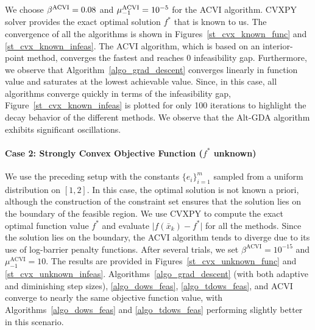 \documentclass{article}
\theoremstyle{plain}
\theoremstyle{definition}
\theoremstyle{remark}
\begin{document}
We choose $\beta^{\rm ACVI} = 0.08$ and $\mu_{-1}^{\rm ACVI} = 10^{-5}$ for the ACVI algorithm. CVXPY solver provides the exact optimal solution $f^*$ that is known to us. The convergence of all the algorithms is shown in Figures~\ref{st_cvx_known_func} and \ref{st_cvx_known_infeas}. The ACVI algorithm, which is based on an interior-point method, converges the fastest and reaches $0$ infeasibility gap. Furthermore, we observe that Algorithm~\ref{algo_grad_descent} converges linearly in function value and saturates at the lowest achievable value. Since, in this case, all algorithms converge quickly in terms of the infeasibility gap, Figure~\ref{st_cvx_known_infeas} is plotted for only 100 iterations to highlight the decay behavior of the different methods. We observe that the Alt-GDA algorithm exhibits significant oscillations.


\paragraph{Case 2: Strongly Convex Objective Function ($f^*$ unknown)}

We use the preceding setup with the constants $\{e_i\}_{i=1}^m$ sampled from a uniform distribution on $[1,2]$. In this case, the optimal solution is not known a priori, although the construction of the constraint set ensures that the solution lies on the boundary of the feasible region. We use CVXPY to compute the exact optimal function value $f^*$ and evaluate $\lvert f(\bar{x}_k) - f^* \rvert$ for all the methods. Since the solution lies on the boundary, the ACVI algorithm tends to diverge due to its use of log-barrier penalty functions. After several trials, we set $\beta^{\mathrm{ACVI}} = 10^{-15}$ and $\mu_{-1}^{\mathrm{ACVI}} = 10$. The results are provided in Figures~\ref{st_cvx_unknown_func} and \ref{st_cvx_unknown_infeas}. Algorithms~\ref{algo_grad_descent} (with both adaptive and diminishing step sizes), \ref{algo_dows_feas}, \ref{algo_tdows_feas}, and ACVI converge to nearly the same objective function value, with Algorithms~\ref{algo_dows_feas} and \ref{algo_tdows_feas} performing slightly better in this scenario.
\end{document}
